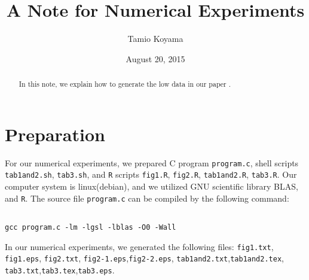 \documentclass{article}
\title{A Note for Numerical Experiments}
\author{Tamio Koyama}
\date{August 20, 2015}
\begin{document}
\maketitle

\begin{abstract}
In this note, we explain how to generate the low data in our paper
\cite{koyama-takemura2}.
\end{abstract}

\section{Preparation}
For our numerical experiments, we prepared C program {\tt program.c}, 
shell scripts {\tt tab1and2.sh}, {\tt tab3.sh},
and {\tt R} scripts {\tt fig1.R}, {\tt fig2.R}, {\tt tab1and2.R}, {\tt tab3.R}.
Our computer system is linux(debian), and we utilized GNU scientific library
BLAS, and {\tt R}.
The source file {\tt program.c} can be compiled by the following command:
\begin{lstlisting}[style=BashInputStyle]

gcc program.c -lm -lgsl -lblas -O0 -Wall 
\end{lstlisting}

 
In our numerical experiments, we generated the following files:
{\tt fig1.txt}, {\tt fig1.eps},
{\tt fig2.txt}, {\tt fig2-1.eps},{\tt fig2-2.eps},
{\tt tab1and2.txt},{\tt tab1and2.tex},
{\tt tab3.txt},{\tt tab3.tex},{\tt tab3.eps}.
\end{document}
